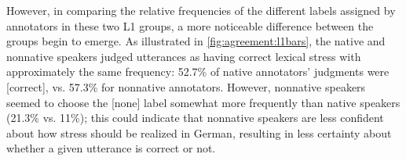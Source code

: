 		
%			
%			
		
		

		However, in comparing the relative frequencies of the different labels assigned by annotators in these two L1 groups, a more noticeable difference between the groups begin to emerge. As illustrated in \cref{fig:agreement:l1bars}, the native and nonnative speakers judged utterances as having correct lexical stress with approximately the same frequency: 52.7\% of native annotators' judgments were [correct], vs. 57.3\% for nonnative annotators. However, nonnative speakers seemed to choose the [none]
		label somewhat more frequently than native speakers (21.3\% vs. 11\%); this could indicate that nonnative speakers are less confident about how stress should be realized in German, resulting in less certainty about whether a given utterance is correct or not. 
		
